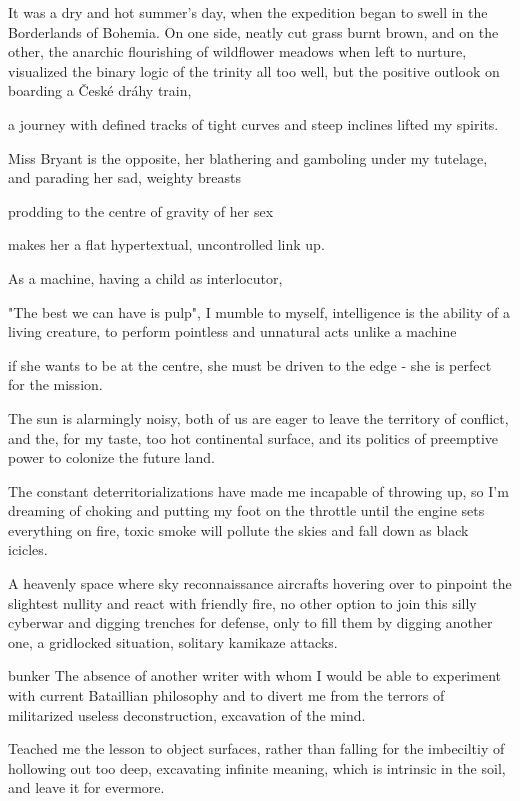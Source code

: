\documentclass{article}
\begin{document}
It was a dry and hot summer's day, 
when the expedition began to swell in the Borderlands of Bohemia.
On one side, neatly cut grass burnt brown, and on the other, the anarchic flourishing
of wildflower meadows when left to nurture,
visualized the binary logic of the trinity all too well,
but the positive outlook on boarding a České dráhy train, 



a journey with defined
tracks of tight curves and steep inclines lifted my spirits.

Miss Bryant is the opposite, 
her blathering and gamboling under my tutelage, 
and parading her sad, weighty breasts

prodding to the centre of gravity of her sex

makes her a flat hypertextual, uncontrolled link up. 

As a machine, having a child as interlocutor, 

"The best we can have is pulp", I mumble to myself,
intelligence is the ability of a living creature, 
to perform pointless and unnatural acts
unlike a machine

if she wants to be at the centre, 
she must be driven to the edge - 
she is perfect for the mission.


The sun is alarmingly noisy, 
both of us are eager to leave the territory of conflict, 
and the, for my taste, too hot continental surface, 
and its politics of preemptive power to colonize the future land. 




The constant deterritorializations 
have made me incapable of throwing up,
so I'm dreaming of choking
and putting my foot on the throttle 
until the engine sets everything on fire, 
toxic smoke will pollute the skies and fall down as black icicles.


A heavenly space where sky reconnaissance aircrafts 
hovering over to pinpoint the slightest nullity and react with friendly fire, 
no other option to join this silly cyberwar and digging trenches for defense, 
only to fill them by digging another one,
a gridlocked situation, 
solitary kamikaze attacks.

bunker
The absence of another writer with whom I would be able 
to experiment with current Bataillian philosophy 
and to divert me from the terrors of militarized 
useless deconstruction, excavation  of the mind.

Teached me the lesson to object surfaces, 
rather than falling for the imbeciltiy of hollowing out too deep, 
excavating infinite meaning, 
which is intrinsic in the soil, 
and leave it for evermore. 
\end{document}
